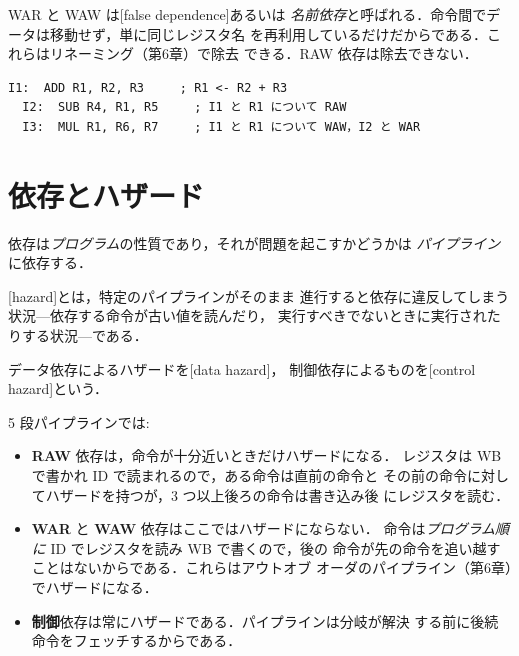 \documentclass[../main.tex]{subfiles}
\begin{document}
WAR と WAW は[false dependence]あるいは
\emph{名前依存}と呼ばれる．命令間でデータは移動せず，単に同じレジスタ名
を再利用しているだけだからである．これらはリネーミング（第6章）で除去
できる．RAW 依存は除去できない．

\begin{example}\leavevmode %
  \begin{lstlisting}[language={[x86masm]Assembler}, numbers=none]
  I1:  ADD R1, R2, R3     ; R1 <- R2 + R3
  I2:  SUB R4, R1, R5     ; I1 と R1 について RAW
  I3:  MUL R1, R6, R7     ; I1 と R1 について WAW，I2 と WAR
\end{lstlisting}
\end{example}

\section{依存とハザード}

依存は\emph{プログラム}の性質であり，それが問題を起こすかどうかは
\emph{パイプライン}に依存する．

\begin{definition}[ハザード]
  [hazard]とは，特定のパイプラインがそのまま
  進行すると依存に違反してしまう状況---依存する命令が古い値を読んだり，
  実行すべきでないときに実行されたりする状況---である．
\end{definition}

データ依存によるハザードを[data hazard]，
制御依存によるものを[control hazard]という．

5 段パイプラインでは:
\begin{itemize}
  \item \textbf{RAW} 依存は，命令が十分近いときだけハザードになる．
    レジスタは WB で書かれ ID で読まれるので，ある命令は直前の命令と
    その前の命令に対してハザードを持つが，3 つ以上後ろの命令は書き込み後
    にレジスタを読む．
  \item \textbf{WAR} と \textbf{WAW} 依存はここではハザードにならない．
    命令は\emph{プログラム順に} ID でレジスタを読み WB で書くので，後の
    命令が先の命令を追い越すことはないからである．これらはアウトオブ
    オーダのパイプライン（第6章）でハザードになる．
  \item \textbf{制御}依存は常にハザードである．パイプラインは分岐が解決
    する前に後続命令をフェッチするからである．
\end{itemize}
\end{document}
